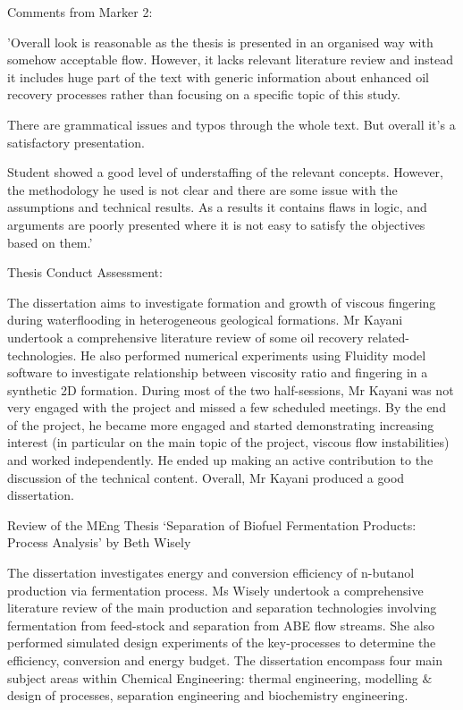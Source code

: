\documentclass[14pt,twoside]{report}
\begin{document}
\bigskip
\noindent
{\Large Comments from Marker 2:}

'Overall look is reasonable as the thesis is presented in an organised way with somehow acceptable flow. However, it lacks relevant literature review and instead it includes huge part of the text with generic information about enhanced oil recovery processes rather than focusing on a specific topic of this study.

There are grammatical issues and typos through the whole text. But overall it’s a satisfactory presentation.

Student showed a good level of understaffing of the relevant concepts. However, the methodology he used is not clear and there are some issue with the assumptions and technical results. As a results it contains flaws in logic, and arguments are poorly presented where it is not easy to satisfy the objectives based on them.'


\bigskip
\noindent
{\Large Thesis Conduct Assessment:}

The dissertation aims to investigate formation and growth of viscous fingering during waterflooding in heterogeneous geological formations. Mr Kayani undertook a comprehensive literature review of some oil recovery related-technologies. He also performed numerical experiments using Fluidity model software to investigate relationship between viscosity ratio and fingering in a synthetic 2D formation.  During most of the two half-sessions, Mr Kayani was not very engaged with the project and missed a few scheduled meetings. By the end of the project, he became more engaged and started demonstrating increasing interest (in particular on the main topic of the project, viscous flow instabilities) and worked independently. He ended up making an active contribution to the discussion of the technical content.  Overall, Mr Kayani produced a good dissertation.

\vfill
\clearpage





\bigskip

\begin{center}
  {\Large Review of the MEng Thesis `Separation of Biofuel Fermentation Products: Process Analysis' by Beth Wisely}
\end{center}
The dissertation investigates energy and conversion efficiency of n-butanol production via fermentation process. Ms Wisely undertook a comprehensive literature review of the main production and separation technologies involving fermentation from feed-stock and separation from ABE flow streams. She also performed simulated design experiments of the key-processes to determine the efficiency, conversion and energy budget. The dissertation encompass four main subject areas within Chemical Engineering: thermal engineering, modelling $\&$ design of processes, separation engineering and biochemistry engineering.
\end{document}
